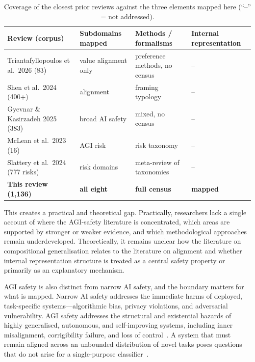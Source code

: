 \begin{table}[htbp]
\centering
\caption{Coverage of the closest prior reviews against the three elements mapped here (``--'' = not addressed).}
\label{tab:prior-reviews}
\begin{tabular}{p{3.2cm} p{2.6cm} p{3.6cm} p{3.6cm}}
\toprule
Review (corpus) & Subdomains mapped & Methods / formalisms & Internal representation \\
\midrule
Triantafyllopoulos et al.~2026 (83) & value alignment only & preference methods, no census & -- \\
Shen et al.~2024 (400+) & alignment & framing typology & -- \\
Gyevnar \& Kasirzadeh 2025 (383) & broad AI safety & mixed, no census & -- \\
McLean et al.~2023 (16) & AGI risk & risk taxonomy & -- \\
Slattery et al.~2024 (777 risks) & risk domains & meta-review of taxonomies & -- \\
\textbf{This review (1,136)} & \textbf{all eight} & \textbf{full census} & \textbf{mapped} \\
\bottomrule
\end{tabular}
\end{table}

This creates a practical and theoretical gap. Practically, researchers lack a single account of where the AGI-safety literature is concentrated, which areas are supported by stronger or weaker evidence, and which methodological approaches remain underdeveloped. Theoretically, it remains unclear how the literature on compositional generalisation relates to the literature on alignment and whether internal representation structure is treated as a central safety property or primarily as an explanatory mechanism.

AGI safety is also distinct from narrow AI safety, and the boundary matters for what is mapped. Narrow AI safety addresses the immediate harms of deployed, task-specific systems---algorithmic bias, privacy violations, and adversarial vulnerability. AGI safety addresses the structural and existential hazards of highly generalised, autonomous, and self-improving systems, including inner misalignment, corrigibility failure, and loss of control~\cite{hendrycks2023overview,russell2019human,bostrom2014superintelligence}. A system that must remain aligned across an unbounded distribution of novel tasks poses questions that do not arise for a single-purpose classifier~\cite{russell2019human}.

